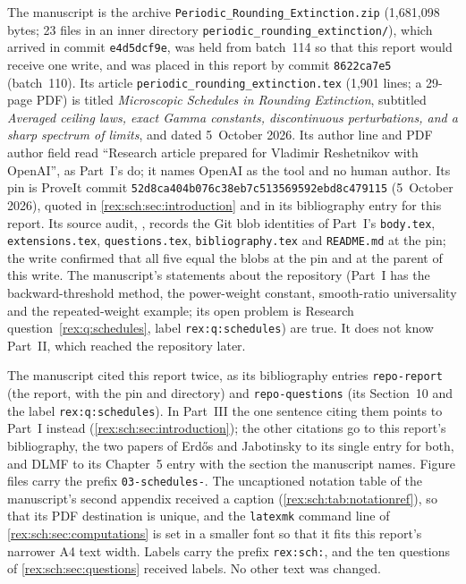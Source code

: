 The manuscript is the archive \nolinkurl{Periodic_Rounding_Extinction.zip}
(1,681,098 bytes; 23 files in an inner directory
\texttt{periodic\_rounding\_extinction/}), which arrived in commit
\texttt{e4d5dcf9e}, was held from batch~114 so that this report would
receive one write, and was placed in this report by commit
\texttt{8622ca7e5} (batch~110). Its article
\texttt{periodic\_rounding\_extinction.tex} (1,901 lines; a 29-page PDF) is
titled \emph{Microscopic Schedules in Rounding Extinction}, subtitled
\emph{Averaged ceiling laws, exact Gamma constants, discontinuous
perturbations, and a sharp spectrum of limits}, and dated 5~October 2026.
Its author line and PDF author field read ``Research article prepared for
Vladimir Reshetnikov with OpenAI'', as Part~I's do; it names OpenAI as the
tool and no human author. Its pin is ProveIt commit
\texttt{52d8ca404b076c38eb7c513569592ebd8c479115} (5~October 2026), quoted
in \cref{rex:sch:sec:introduction} and in its bibliography entry for this
report. Its source audit,
, records the Git blob identities of
Part~I's \texttt{body.tex}, \texttt{extensions.tex}, \texttt{questions.tex},
\texttt{bibliography.tex} and \texttt{README.md} at the pin; the write
confirmed that all five equal the blobs at the pin and at the parent of
this write. The manuscript's statements about the repository (Part~I has
the backward-threshold method, the power-weight constant, smooth-ratio
universality and the repeated-weight example; its open problem is
Research question~\ref{rex:q:schedules}, label \texttt{rex:q:schedules})
are true. It does not know Part~II, which reached the repository later.

The manuscript cited this report twice, as its bibliography entries
\texttt{repo-report} (the report, with the pin and directory) and
\texttt{repo-questions} (its Section~10 and the label
\texttt{rex:q:schedules}). In Part~III the one sentence citing them points
to Part~I instead (\cref{rex:sch:sec:introduction}); the other citations
go to this report's bibliography, the two papers of Erd\H{o}s and
Jabotinsky to its single entry for both, and DLMF to its Chapter~5 entry
with the section the manuscript names. Figure files carry the prefix
\texttt{03-schedules-}. The uncaptioned notation table of the manuscript's
second appendix received a caption (\cref{rex:sch:tab:notationref}), so that
its PDF destination is unique, and the \texttt{latexmk} command line of
\cref{rex:sch:sec:computations} is set in a smaller font so that it fits
this report's narrower A4 text width. Labels carry the prefix
\texttt{rex:sch:}, and the ten questions of \cref{rex:sch:sec:questions}
received labels. No other text was changed.

